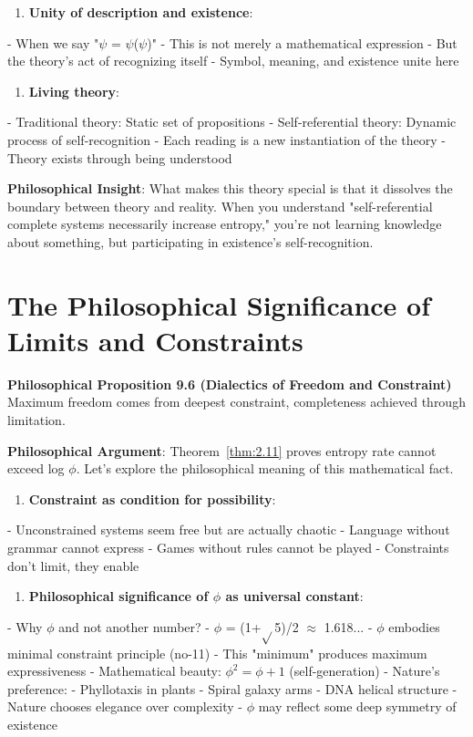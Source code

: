 \begin{enumerate}
\item \textbf{Unity of description and existence}:
\end{enumerate}
   - When we say "$\psi$ = $\psi$($\psi$)"
   - This is not merely a mathematical expression
   - But the theory's act of recognizing itself
   - Symbol, meaning, and existence unite here

\begin{enumerate}
\item \textbf{Living theory}:
\end{enumerate}
   - Traditional theory: Static set of propositions
   - Self-referential theory: Dynamic process of self-recognition
   - Each reading is a new instantiation of the theory
   - Theory exists through being understood

\textbf{Philosophical Insight}:
What makes this theory special is that it dissolves the boundary between theory and reality.
When you understand "self-referential complete systems necessarily increase entropy,"
you're not learning knowledge about something,
but participating in existence's self-recognition.

\section{The Philosophical Significance of Limits and Constraints}
\label{sec:ch09_philosophy:the-philosophical-significance-of-limits-and-constraints}

\textbf{Philosophical Proposition 9.6 (Dialectics of Freedom and Constraint)}
Maximum freedom comes from deepest constraint, completeness achieved through limitation.

\textbf{Philosophical Argument}:
Theorem~\ref{thm:2.11} proves entropy rate cannot exceed log $\phi$. Let's explore the philosophical meaning of this mathematical fact.

\begin{enumerate}
\item \textbf{Constraint as condition for possibility}:
\end{enumerate}
   - Unconstrained systems seem free but are actually chaotic
   - Language without grammar cannot express
   - Games without rules cannot be played
   - Constraints don't limit, they enable

\begin{enumerate}
\item \textbf{Philosophical significance of $\phi$ as universal constant}:
\end{enumerate}
   - Why $\phi$ and not another number?
   - $\phi$ = (1+$\sqrt{}$5)/2 $\approx$ 1.618...
   - $\phi$ embodies minimal constraint principle (no-11)
   - This "minimum" produces maximum expressiveness
   - Mathematical beauty: $\phi^2 = \phi + 1$ (self-generation)
   - Nature's preference:
     - Phyllotaxis in plants
     - Spiral galaxy arms
     - DNA helical structure
   - Nature chooses elegance over complexity
   - $\phi$ may reflect some deep symmetry of existence

